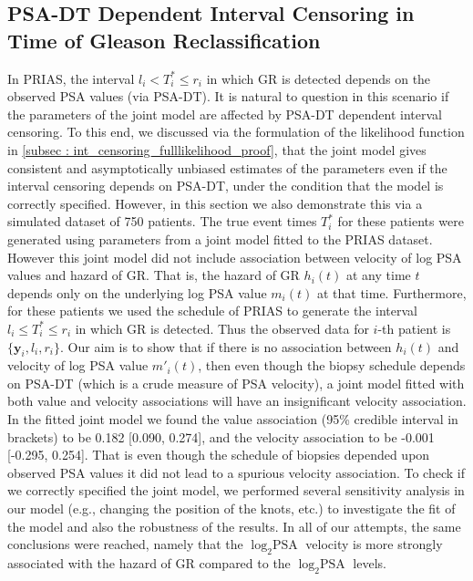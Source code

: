 \clearpage
\subsection{PSA-DT Dependent Interval Censoring in Time of Gleason Reclassification}
In PRIAS, the interval $l_i < T_i^* \leq r_i$ in which GR is detected depends on the observed PSA values (via PSA-DT). It is natural to question in this scenario if the parameters of the joint model are affected by PSA-DT dependent interval censoring. To this end, we discussed via the formulation of the likelihood function in \ref{subsec : int_censoring_fulllikelihood_proof}, that the joint model gives consistent and asymptotically unbiased estimates of the parameters even if the interval censoring depends on PSA-DT, under the condition that the model is correctly specified. However, in this section we also demonstrate this via a simulated dataset of 750 patients. The true event times $T^*_i$ for these patients were generated using parameters from a joint model fitted to the PRIAS dataset. However this joint model did not include association between velocity of log PSA values and hazard of GR. That is, the hazard of GR $h_i(t)$ at any time $t$ depends only on the underlying log PSA value $m_i(t)$ at that time. Furthermore, for these patients we used the schedule of PRIAS to generate the interval $l_i \leq T^*_i \leq r_i$ in which GR is detected. Thus the observed data for $i$-th patient is $\{\boldsymbol{y}_i, l_i, r_i\}$. Our aim is to show that if there is no association between $h_i(t)$ and velocity of log PSA value $m'_i(t)$, then even though the biopsy schedule depends on PSA-DT (which is a crude measure of PSA velocity), a joint model fitted with both value and velocity associations will have an insignificant velocity association. In the fitted joint model we found the value association (95\% credible interval in brackets) to be 0.182 [0.090, 0.274], and the velocity association to be -0.001 [-0.295, 0.254]. That is even though the schedule of biopsies depended upon observed PSA values it did not lead to a spurious velocity association. To check if we correctly specified the joint model, we performed several sensitivity analysis in our model (e.g., changing the position of the knots, etc.) to investigate the fit of the model and also the robustness of the results. In all of our attempts, the same conclusions were reached, namely that the $\log_2 \mbox{PSA}$ velocity is more strongly associated with the hazard of GR compared to the $\log_2 \mbox{PSA}$ levels.